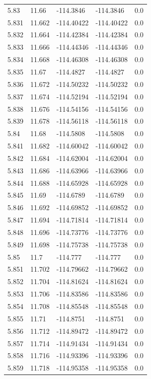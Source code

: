 \begin{tabular}{lllll}
5.83 & 11.66 & -114.3846 & -114.3846 & 0.0 \\
5.831 & 11.662 & -114.40422 & -114.40422 & 0.0 \\
5.832 & 11.664 & -114.42384 & -114.42384 & 0.0 \\
5.833 & 11.666 & -114.44346 & -114.44346 & 0.0 \\
5.834 & 11.668 & -114.46308 & -114.46308 & 0.0 \\
5.835 & 11.67 & -114.4827 & -114.4827 & 0.0 \\
5.836 & 11.672 & -114.50232 & -114.50232 & 0.0 \\
5.837 & 11.674 & -114.52194 & -114.52194 & 0.0 \\
5.838 & 11.676 & -114.54156 & -114.54156 & 0.0 \\
5.839 & 11.678 & -114.56118 & -114.56118 & 0.0 \\
5.84 & 11.68 & -114.5808 & -114.5808 & 0.0 \\
5.841 & 11.682 & -114.60042 & -114.60042 & 0.0 \\
5.842 & 11.684 & -114.62004 & -114.62004 & 0.0 \\
5.843 & 11.686 & -114.63966 & -114.63966 & 0.0 \\
5.844 & 11.688 & -114.65928 & -114.65928 & 0.0 \\
5.845 & 11.69 & -114.6789 & -114.6789 & 0.0 \\
5.846 & 11.692 & -114.69852 & -114.69852 & 0.0 \\
5.847 & 11.694 & -114.71814 & -114.71814 & 0.0 \\
5.848 & 11.696 & -114.73776 & -114.73776 & 0.0 \\
5.849 & 11.698 & -114.75738 & -114.75738 & 0.0 \\
5.85 & 11.7 & -114.777 & -114.777 & 0.0 \\
5.851 & 11.702 & -114.79662 & -114.79662 & 0.0 \\
5.852 & 11.704 & -114.81624 & -114.81624 & 0.0 \\
5.853 & 11.706 & -114.83586 & -114.83586 & 0.0 \\
5.854 & 11.708 & -114.85548 & -114.85548 & 0.0 \\
5.855 & 11.71 & -114.8751 & -114.8751 & 0.0 \\
5.856 & 11.712 & -114.89472 & -114.89472 & 0.0 \\
5.857 & 11.714 & -114.91434 & -114.91434 & 0.0 \\
5.858 & 11.716 & -114.93396 & -114.93396 & 0.0 \\
5.859 & 11.718 & -114.95358 & -114.95358 & 0.0 \\

\end{tabular}
